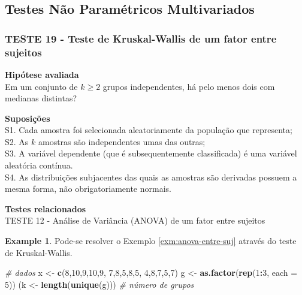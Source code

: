 \documentclass[
]{book}
\newenvironment{Shaded}{\begin{snugshade}}{\end{snugshade}}
\newcommand{\CommentTok}[1]{\textcolor[rgb]{0.56,0.35,0.01}{\textit{#1}}}
\newcommand{\DataTypeTok}[1]{\textcolor[rgb]{0.13,0.29,0.53}{#1}}
\newcommand{\DecValTok}[1]{\textcolor[rgb]{0.00,0.00,0.81}{#1}}
\newcommand{\KeywordTok}[1]{\textcolor[rgb]{0.13,0.29,0.53}{\textbf{#1}}}
\newcommand{\NormalTok}[1]{#1}
\newcommand{\OperatorTok}[1]{\textcolor[rgb]{0.81,0.36,0.00}{\textbf{#1}}}
\newcommand{\StringTok}[1]{\textcolor[rgb]{0.31,0.60,0.02}{#1}}
\theoremstyle{definition}
\theoremstyle{definition}
\newtheorem{example}{Example}[chapter]
\theoremstyle{definition}
\theoremstyle{remark}
\begin{document}
\hypertarget{testes-nuxe3o-paramuxe9tricos-multivariados}{%
\subsection{Testes Não Paramétricos Multivariados}\label{testes-nuxe3o-paramuxe9tricos-multivariados}}

\hypertarget{teste-19---teste-de-kruskal-wallis-de-um-fator-entre-sujeitos}{%
\subsubsection*{TESTE 19 - Teste de Kruskal-Wallis de um fator entre sujeitos}\label{teste-19---teste-de-kruskal-wallis-de-um-fator-entre-sujeitos}}

\textbf{Hipótese avaliada}\\
Em um conjunto de \(k \ge 2\) grupos independentes, há pelo menos dois com medianas distintas?

\textbf{Suposições}\\
S1. Cada amostra foi selecionada aleatoriamente da população que representa;\\
S2. As \(k\) amostras são independentes umas das outras;\\
S3. A variável dependente (que é subsequentemente classificada) é uma variável aleatória contínua.\\
S4. As distribuições subjacentes das quais as amostras são derivadas possuem a mesma forma, não obrigatoriamente normais.

\textbf{Testes relacionados}\\
TESTE 12 - Análise de Variância (ANOVA) de um fator entre sujeitos

\begin{example}
\protect\hypertarget{exm:kw-entre-suj}{}{\label{exm:kw-entre-suj} }Pode-se resolver o Exemplo \ref{exm:anova-entre-suj} através do teste de Kruskal-Wallis.
\end{example}

\begin{Shaded}
\begin{Highlighting}[]
\CommentTok{\# dados}
\NormalTok{x \textless{}{-}}\StringTok{ }\KeywordTok{c}\NormalTok{(}\DecValTok{8}\NormalTok{,}\DecValTok{10}\NormalTok{,}\DecValTok{9}\NormalTok{,}\DecValTok{10}\NormalTok{,}\DecValTok{9}\NormalTok{, }\DecValTok{7}\NormalTok{,}\DecValTok{8}\NormalTok{,}\DecValTok{5}\NormalTok{,}\DecValTok{8}\NormalTok{,}\DecValTok{5}\NormalTok{, }\DecValTok{4}\NormalTok{,}\DecValTok{8}\NormalTok{,}\DecValTok{7}\NormalTok{,}\DecValTok{5}\NormalTok{,}\DecValTok{7}\NormalTok{)}
\NormalTok{g \textless{}{-}}\StringTok{ }\KeywordTok{as.factor}\NormalTok{(}\KeywordTok{rep}\NormalTok{(}\DecValTok{1}\OperatorTok{:}\DecValTok{3}\NormalTok{, }\DataTypeTok{each =} \DecValTok{5}\NormalTok{))}
\NormalTok{(k \textless{}{-}}\StringTok{ }\KeywordTok{length}\NormalTok{(}\KeywordTok{unique}\NormalTok{(g))) }\CommentTok{\# número de grupos}
\end{Highlighting}
\end{Shaded}
\end{document}

